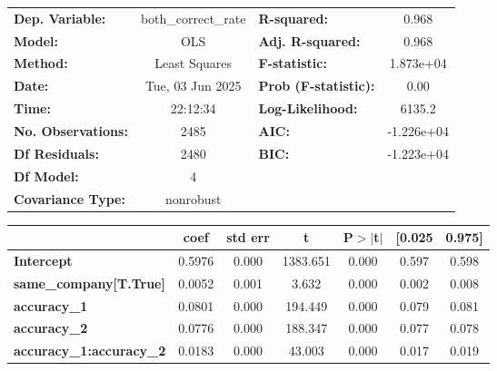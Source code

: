\begin{center}
\begin{tabular}{lclc}
\toprule
\textbf{Dep. Variable:}          & both\_correct\_rate & \textbf{  R-squared:         } &     0.968   \\
\textbf{Model:}                  &         OLS         & \textbf{  Adj. R-squared:    } &     0.968   \\
\textbf{Method:}                 &    Least Squares    & \textbf{  F-statistic:       } & 1.873e+04   \\
\textbf{Date:}                   &   Tue, 03 Jun 2025  & \textbf{  Prob (F-statistic):} &     0.00    \\
\textbf{Time:}                   &       22:12:34      & \textbf{  Log-Likelihood:    } &    6135.2   \\
\textbf{No. Observations:}       &          2485       & \textbf{  AIC:               } & -1.226e+04  \\
\textbf{Df Residuals:}           &          2480       & \textbf{  BIC:               } & -1.223e+04  \\
\textbf{Df Model:}               &             4       & \textbf{                     } &             \\
\textbf{Covariance Type:}        &      nonrobust      & \textbf{                     } &             \\
\bottomrule
\end{tabular}
\begin{tabular}{lcccccc}
                                 & \textbf{coef} & \textbf{std err} & \textbf{t} & \textbf{P$> |$t$|$} & \textbf{[0.025} & \textbf{0.975]}  \\
\midrule
\textbf{Intercept}               &       0.5976  &        0.000     &  1383.651  &         0.000        &        0.597    &        0.598     \\
\textbf{same\_company[T.True]}   &       0.0052  &        0.001     &     3.632  &         0.000        &        0.002    &        0.008     \\
\textbf{accuracy\_1}             &       0.0801  &        0.000     &   194.449  &         0.000        &        0.079    &        0.081     \\
\textbf{accuracy\_2}             &       0.0776  &        0.000     &   188.347  &         0.000        &        0.077    &        0.078     \\
\textbf{accuracy\_1:accuracy\_2} &       0.0183  &        0.000     &    43.003  &         0.000        &        0.017    &        0.019     \\

\end{tabular}
\end{center}
